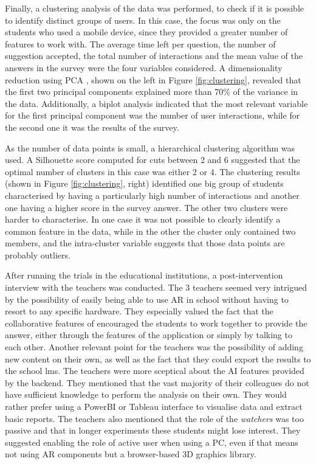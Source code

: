 Finally, a clustering analysis of the data was performed, to check if it is possible to identify distinct groups of users.
In this case, the focus was only on the students who used a mobile device, since they provided a greater number of features to work with.
The average time left per question, the number of suggestion accepted, the total number of interactions and the mean value of the answers in the survey were the four variables considered.
A dimensionality reduction using PCA \citep{jolliffe2002principal}, shown on the left in Figure \ref{fig:clustering}, revealed that the first two principal components explained more than 70\% of the variance in the data.
Additionally, a biplot analysis indicated that the most relevant variable for the first principal component was the number of user interactions, while for the second one it was the results of the survey.

As the number of data points is small, a hierarchical clustering algorithm \citep{hiera} was used.
A Silhouette score \citep{ROUSSEEUW198753} computed for cuts between 2 and 6 suggested that the optimal number of clusters in this case was either 2 or 4.
The clustering results (shown in Figure \ref{fig:clustering}, right) identified one big group of students characterised by having a particularly high number of interactions and another one having a higher score in the survey answer.
The other two clusters were harder to characterise.
In one case it was not possible to clearly identify a common feature in the data, while in the other the cluster only contained two members, and the intra-cluster variable suggests that those data points are probably outliers.

After running the trials in the educational institutions, a post-intervention interview with the teachers was conducted.
The 3 teachers seemed very intrigued by the possibility of easily being able to use AR in school without having to resort to any specific hardware. They especially valued the fact that the collaborative features of \appname{} encouraged the students to work together to provide the answer, either through the features of the application or simply by talking to each other.
Another relevant point for the teachers was the possibility of adding new content on their own, as well as the fact that they could export the results to the school \gls{lms}.
The teachers were more sceptical about the AI features provided by the backend. They mentioned that the vast majority of their colleagues do not have sufficient knowledge to perform the analysis on their own. They would rather prefer using a PowerBI or Tableau interface to visualise data and extract basic reports.
The teachers also mentioned that the role of the \textit{watchers} was too passive and that in longer experiments these students might lose interest. They suggested enabling the role of active user when using a PC, even if that means not using AR components but a browser-based 3D graphics library.

